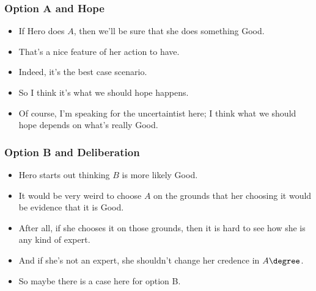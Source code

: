 \begin{frame}[fragile]
\frametitle{Option A and Hope}
\label{optionaandhope}

\begin{itemize}
\item{} If Hero does $A$, then we'll be sure that she does something Good.

\item{} That's a nice feature of her action to have.

\item{} Indeed, it's the best case scenario.

\item{} So I think it's what we should hope happens. \pause 

\item{} Of course, I'm speaking for the uncertaintist here; I think what we should hope depends on what's really Good.

\end{itemize}

\end{frame}

\begin{frame}[fragile]
\frametitle{Option B and Deliberation}
\label{optionbanddeliberation}

\begin{itemize}
\item{} Hero starts out thinking $B$ is more likely Good.

\item{} It would be very weird to choose $A$ on the grounds that her choosing it would be evidence that it is Good.

\item{} After all, if she chooses it on those grounds, then it is hard to see how she is any kind of expert.

\item{} And if she's not an expert, she shouldn't change her credence in $A\degree$.

\item{} So maybe there is a case here for option B.

\end{itemize}

\end{frame}

